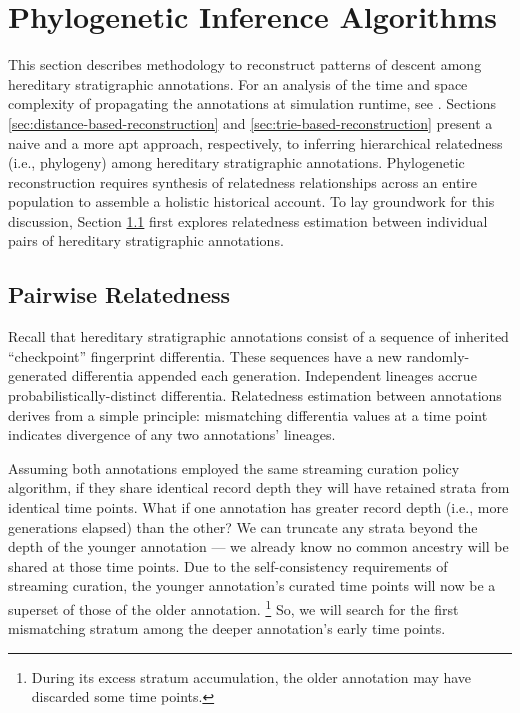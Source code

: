\section{Phylogenetic Inference Algorithms} \label{sec:reconstruction-algorithm}

This section describes methodology to reconstruct patterns of descent among hereditary stratigraphic annotations.  %
For an analysis of the time and space complexity of propagating the annotations at simulation runtime, see \citep{OTHERPREPRINT}. %
Sections \ref{sec:distance-based-reconstruction} and \ref{sec:trie-based-reconstruction} present a naive and a more apt approach, respectively, to inferring hierarchical relatedness (i.e., phylogeny) among hereditary stratigraphic annotations.
Phylogenetic reconstruction requires synthesis of relatedness relationships across an entire population to assemble a holistic historical account.  %
To lay groundwork for this discussion, Section \ref{sec:pairwise-relatedness} first explores relatedness estimation between individual pairs of hereditary stratigraphic annotations.

\subsection{Pairwise Relatedness}
\label{sec:pairwise-relatedness}

Recall that hereditary stratigraphic annotations consist of a sequence of inherited ``checkpoint'' fingerprint differentia.
These sequences have a new randomly-generated differentia appended each generation.
Independent lineages accrue probabilistically-distinct differentia.
Relatedness estimation between annotations derives from a simple principle: mismatching differentia values at a time point indicates divergence of any two annotations' lineages.

Assuming both annotations employed the same streaming curation policy algorithm, if they share identical record depth they will have retained strata from identical time points.
What if one annotation has greater record depth (i.e., more generations elapsed) than the other?
We can truncate any strata beyond the depth of the younger annotation --- we already know no common ancestry will be shared at those time points.
Due to the self-consistency requirements of streaming curation, the younger annotation's curated time points will now be a superset of those of the older annotation.%
\footnote{During its excess stratum accumulation, the older annotation may have discarded some time points.}
So, we will search for the first mismatching stratum among the deeper annotation's early time points.

